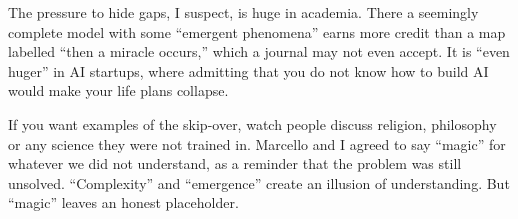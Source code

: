 The pressure to hide gaps, I suspect, is huge in academia. There a seemingly complete model with some ``emergent phenomena'' earns more credit than a map labelled ``then a miracle occurs,'' which a journal may not even accept. It is ``even huger'' in AI startups, where admitting that you do not know how to build AI would make your life plans collapse.

If you want examples of the skip-over, watch people discuss religion, philosophy or any science they were not trained in. Marcello and I agreed to say ``magic'' for whatever we did not understand, as a reminder that the problem was still unsolved. ``Complexity'' and ``emergence'' create an illusion of understanding. But ``magic'' leaves an honest placeholder.
